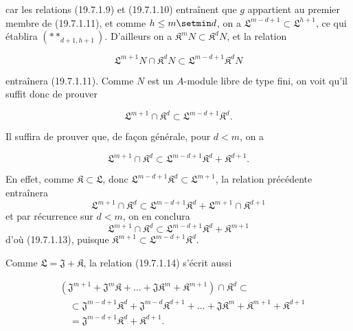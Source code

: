 car les relations (19.7.1.9) et (19.7.1.10) entraînent que $g$ appartient au premier membre de (19.7.1.11), et comme $h\leq m\setmin d$, on a $\mathfrak L^{m-d+1}\subset\mathfrak L^{h+1}$, ce qui établira $(**_{d+1,h+1})$. D'ailleurs on a $\mathfrak K^mN\subset\mathfrak K^dN$, et la relation
\begin{env}[19.7.1.12]
\label{IV.19.7.1.12}
\[
  \mathfrak L^{m+1}N\cap\mathfrak K^dN\subset\mathfrak L^{m-d+1}\mathfrak K^dN
\]
\end{env}
entraînera (19.7.1.11). Comme $N$ est un $A$-module libre de type fini, on voit qu'il suffit donc de prouver
\begin{env}[19.7.1.13]
\label{IV.19.7.1.13}
\[
  \mathfrak L^{m+1}\cap\mathfrak K^d\subset\mathfrak L^{m-d+1}\mathfrak K^d.
\]
\end{env}

Il suffira de prouver que, de façon générale, pour $d<m$, on a
\begin{env}[19.7.1.14]
\label{IV.19.7.1.14}
\[
  \mathfrak L^{m+1}\cap\mathfrak K^d\subset\mathfrak L^{m-d+1}\mathfrak K^d+\mathfrak K^{d+1}.
\]
\end{env}
En effet, comme $\mathfrak K\subset\mathfrak L$, donc $\mathfrak L^{m-d+1}\mathfrak K^d\subset\mathfrak L^{m+1}$, la relation précédente entraînera
\[
  \mathfrak L^{m+1}\cap\mathfrak K^d\subset\mathfrak L^{m-d+1}\mathfrak K^d+\mathfrak L^{m+1}\cap\mathfrak K^{d+1}
\]
et par récurrence sur $d<m$, on en conclura
\[
  \mathfrak L^{m+1}\cap\mathfrak K^d\subset\mathfrak L^{m-d+1}\mathfrak K^d+\mathfrak K^{m+1}
\]
d'où (19.7.1.13), puisque $\mathfrak K^{m+1}\subset\mathfrak L^{m-d+1}\mathfrak K^d$.

Comme $\mathfrak L=\mathfrak J+\mathfrak K$, la relation (19.7.1.14) s'écrit aussi
\begin{env}[19.7.1.15]
\label{IV.19.7.1.15}
\[
\begin{aligned}
  &(\mathfrak J^{m+1}+\mathfrak J^m\mathfrak K+\ldots+\mathfrak J\mathfrak K^m+\mathfrak K^{m+1})\cap\mathfrak K^d\subset\\
  &\quad\subset\mathfrak J^{m-d+1}\mathfrak K^d+\mathfrak J^{m-d}\mathfrak K^{d+1}+\ldots+\mathfrak J\mathfrak K^m+\mathfrak K^{m+1}+\mathfrak K^{d+1}\\
  &\quad=\mathfrak J^{m-d+1}\mathfrak K^d+\mathfrak K^{d+1}.
\end{aligned}
\]
\end{env}

